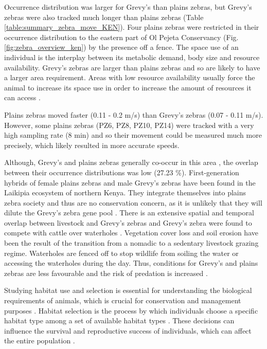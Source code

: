 \documentclass[12pt,a4paper, twoside, english]{article}
\begin{document}

Occurrence distribution was larger for Grevy's than plains zebras, but Grevy's zebras were also tracked much longer than plains zebras (Table \ref{table:summary_zebra_move_KEN}). Four plains zebras were restricted in their occurrence distribution to the eastern part of Ol Pejeta Conservancy (Fig. \ref{fig:zebra_overview_ken}) by the presence off a fence. The space use of an individual is the interplay between its metabolic demand, body size and resource availability. Grevy's zebras are larger than plains zebras and so are likely to have a larger area requirement. Areas with low resource availability usually force the animal to increase its space use in order to increase the amount of resources it can access \citep{vanBeest2011}.

Plains zebras moved faster (0.11 - 0.2 m/s) than Grevy's zebras (0.07 - 0.11 m/s). However, some plains zebras (PZ6, PZ8, PZ10, PZ14) were tracked with a very high sampling rate (8 min) and so their movement could be measured much more precisely, which likely resulted in more accurate speeds. 

Although, Grevy's and plains zebras generally co-occur in this area \citep{Sundaresan2012}, the overlap between their occurrence distributions was low (27.23 \%). First-generation hybrids of female plains zebras and male Grevy’s zebras have been found in the Laikipia ecosystem of northern Kenya. They integrate themselves into plains zebra society and thus are no conservation concern, as it is unlikely that they will dilute the Grevy's zebra gene pool \citep{Cordingley2009}. There is an extensive spatial and temporal overlap between livestock and Grevy's zebras and Grevy's zebra were found to compete with cattle over waterholes \citep{Low2009, Sundaresan2008}. Vegetation cover loss and soil erosion have been the result of the transition from a nomadic to a sedentary livestock grazing regime. Waterholes are fenced off to stop wildlife from soiling the water or accessing the waterholes during the day. Thus, conditions for Grevy's and plains zebras are less favourable and the risk of predation is increased \citep{Sundaresan2012}.


Studying habitat use and selection is essential for understanding the biological requirements of animals, which is crucial for conservation and management purposes \citep{Freitas2008a}. Habitat selection is the process by which individuals choose a specific habitat type among a set of available habitat types \citep{VanMoorter2016}. These decisions can influence the survival and reproductive success of individuals, which can affect the entire population \citep{McLoughlin2007, Matthiopoulos2015}. 
\end{document}
